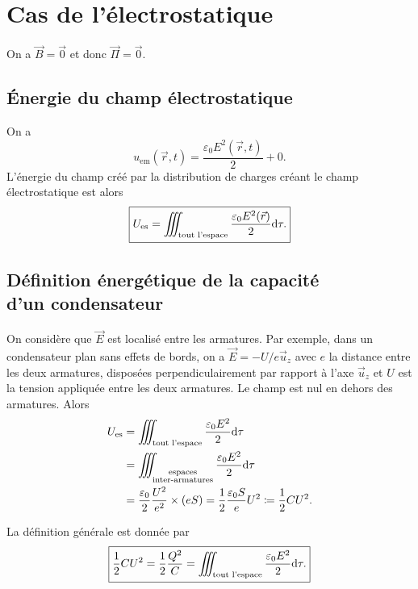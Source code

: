 \section{Cas de l'électrostatique}

On a $\vec{B}=\vec{0}$ et donc $\vec{\Pi}=\vec{0}$.

\subsection{Énergie du champ électrostatique}

On a 
\begin{equation}
    \boxed{
        u_{\mathrm{em}}(\vec{r},t)=\frac{\varepsilon_0 E^{2}(\vec{r},t)}{2}+0.
    }
\end{equation}
L'énergie du champ créé par la distribution de charges créant le champ électrostatique est alors 
\begin{equation}
    \boxed{
        U_{\mathrm{es}}=\iiint_{\text{tout l'espace}}\frac{\varepsilon_0 E^{2}(\vec{r})}{2}\mathrm{d}\tau.
    }
\end{equation}

\subsection{Définition énergétique de la capacité\texorpdfstring{\\}{ }d'un condensateur}

On considère que $\vec{E}$ est localisé entre les armatures. Par exemple, dans un condensateur plan sans effets de bords, on a $\vec{E}=-U/e\vec{u}_z$ avec $e$ la distance entre les deux armatures, disposées perpendiculairement par rapport à l'axe $\vec{u}_z$ et $U$ est la tension appliquée entre les deux armatures. Le champ est nul en dehors des armatures. Alors
\begin{align}
    U_{\mathrm{es}}
    &=
    \iiint_{\text{tout l'espace}}\frac{\varepsilon_0 E^{2}}{2}\mathrm{d}\tau\\
    &=
    \iiint_{\substack{\text{espaces}\\\text{inter-armatures}}}\frac{\varepsilon_0 E^{2}}{2}\mathrm{d}\tau\\
    &=
    \frac{\varepsilon_0}{2}\frac{U^{2}}{e^{2}}\times(e S)=\frac{1}{2}\frac{\varepsilon_0 S}{e}U^{2}\coloneqq\frac{1}{2}C U^{2}.
\end{align}

La définition générale est donnée par
\begin{equation}
    \boxed{
        \frac{1}{2}CU^{2}=\frac{1}{2}\frac{Q^{2}}{C}=\iiint_{\text{tout l'espace}}\frac{\varepsilon_0 E^{2}}{2}\mathrm{d}\tau.
    }
\end{equation}